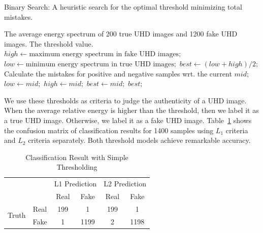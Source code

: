 \documentclass[journal,conference]{IEEEtran}
\begin{document}
\begin{algorithm}[h]
	\caption{Binary Search: A heuristic search for the optimal threshold minimizing total mistakes.}
	\label{alg:binary-search}
	\begin{algorithmic}
		\Require The average energy spectrum of 200 true UHD images and 1200 fake UHD images.
		\Ensure The threshold value.
		\State $high \leftarrow \text{maximum energy spectrum in fake UHD images};$
		\State $low \leftarrow \text{minimum energy spectrum in true UHD images};$
		\State $best \leftarrow (low + high) / 2;$
			\State Calculate the mistakes for positive and negative samples wrt. the current $mid$;
				\State $low \leftarrow mid;$
			\Else
				\State $high \leftarrow mid;$
			\EndIf
				\State $best \leftarrow mid;$
			\EndIf
		\EndWhile
		\State \Return $best;$
	\end{algorithmic}
\end{algorithm}

We use these thresholds as criteria to judge the authenticity of a UHD image.
When the average relative energy is higher than the threshold, then we label it as a true UHD image.
Otherwise, we label it as a fake UHD image.
Table~\ref{tab:threshold-confusion-table} shows the confusion matrix of classification results for 1400 samples using $L_1$ criteria and $L_2$ criteria separately.
Both threshold models achieve remarkable accuracy.

\linespread{1.2}
\begin{table}[h]
	\centering
	\caption{Classification Result with Simple Thresholding}
	\label{tab:threshold-confusion-table}
	\begin{tabular}{|c|c|c|c|c|c|}
	\hline
	\multicolumn{2}{|c|}{\multirow{2}{*}{}} & \multicolumn{2}{c|}{L1 Prediction} & \multicolumn{2}{c|}{L2 Prediction} \\ \cline{3-6} 
	\multicolumn{2}{|c|}{}                  & Real             & Fake            & Real             & Fake            \\ \hline
	\multirow{2}{*}{Truth}      & Real      & 199              & 1               & 199              & 1               \\ \cline{2-6} 
								& Fake      & 1                & 1199            & 2                & 1198            \\ \hline
	\end{tabular}
\end{table}
\linespread{1.0}
\end{document}
